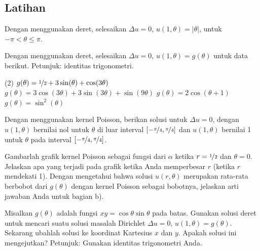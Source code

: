 \subsection{Latihan}

\begin{exercise}
Dengan menggunakan deret, selesaikan
$\Delta u = 0$, $u(1,\theta) = \lvert \theta \rvert$, untuk $-\pi < \theta
\leq \pi$.
\end{exercise}

\begin{exercise}
Dengan menggunakan deret, selesaikan $\Delta u = 0$, $u(1,\theta) = g(\theta)$ untuk
data berikut.  Petunjuk: identitas trigonometri.
\begin{tasks}(2)
\task
$g(\theta) = 
\nicefrac{1}{2} + 3\sin(\theta) + \cos(3\theta)$
\task
$g(\theta) = 
3\cos(3\theta) + 3\sin(3\theta) + \sin(9\theta)$
\task
$g(\theta) = 2 \cos(\theta+1)$
\task
$g(\theta) = \sin^2(\theta)$
\end{tasks}
\end{exercise}

\begin{exercise}
Dengan menggunakan kernel Poisson, berikan solusi untuk
$\Delta u = 0$, dengan $u(1,\theta)$ bernilai nol untuk $\theta$ di luar
interval $[-\nicefrac{\pi}{4},\nicefrac{\pi}{4}]$ dan 
$u(1,\theta)$ bernilai 1 untuk $\theta$ pada interval
$[-\nicefrac{\pi}{4},\nicefrac{\pi}{4}]$.
\end{exercise}

\begin{exercise}
\pagebreak[2]
\leavevmode
\begin{tasks}
\task Gambarlah grafik kernel Poisson sebagai fungsi dari $\alpha$
ketika $r=\nicefrac{1}{2}$ dan $\theta = 0$.
\task Jelaskan apa yang terjadi pada grafik ketika Anda memperbesar $r$ (ketika $r$
mendekati 1).
\task Dengan mengetahui bahwa solusi $u(r,\theta)$ merupakan rata-rata berbobot
dari $g(\theta)$ dengan kernel Poisson sebagai bobotnya, jelaskan arti jawaban Anda
untuk bagian b).
\end{tasks}
\end{exercise}

\begin{exercise} \label{exercise:dirichproblemxy}
Misalkan $g(\theta)$ adalah fungsi $xy = \cos \theta \sin
\theta$ pada batas.  Gunakan solusi deret untuk mencari suatu solusi
masalah Dirichlet $\Delta u = 0$, $u(1,\theta) = g(\theta)$.  Sekarang
ubahlah solusi ke koordinat Kartesius $x$ dan $y$.  Apakah
solusi ini mengejutkan?  Petunjuk: Gunakan identitas trigonometri Anda.
\end{exercise}

